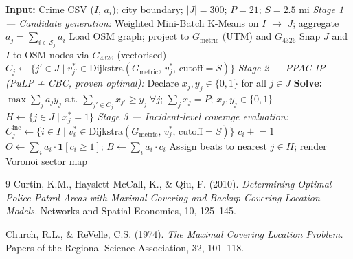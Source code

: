 \documentclass[12pt]{article}
\begin{document}
\begin{algorithm}[H]
\caption{IP PPAC Optimizer (PuLP + CBC)}
\begin{algorithmic}[1]
\State \textbf{Input:} Crime CSV ($I$, $a_i$); city boundary;
       $|J|=300$; $P=21$; $S=2.5$ mi
\State \textit{Stage 1 — Candidate generation:}
    Weighted Mini-Batch K-Means on $I$ $\to$ $J$;
    aggregate $a_j = \sum_{i \in \mathcal{S}_j} a_i$
\State Load OSM graph; project to $G_{\text{metric}}$ (UTM) and $G_{\text{4326}}$
\State Snap $J$ and $I$ to OSM nodes via $G_{\text{4326}}$ (vectorised)
    \State $C_j \leftarrow \{j' \in J \mid v^*_{j'} \in
           \text{Dijkstra}(G_{\text{metric}},\, v^*_j,\, \text{cutoff}=S)\}$
\EndFor
\State \textit{Stage 2 — PPAC IP (PuLP + CBC, proven optimal):}
\State Declare $x_j, y_j \in \{0,1\}$ for all $j \in J$
\State \textbf{Solve:} $\max \sum_{j} a_j y_j$ \; s.t.
    $\sum_{j' \in C_j} x_{j'} \ge y_j \;\forall j$;\;
    $\sum_j x_j = P$;\;
    $x_j, y_j \in \{0,1\}$
\State $H \leftarrow \{j \in J \mid x^*_j = 1\}$
\State \textit{Stage 3 — Incident-level coverage evaluation:}
    \State $C^{\text{inc}}_j \leftarrow \{i \in I \mid v^*_i \in
           \text{Dijkstra}(G_{\text{metric}},\, v^*_j,\, \text{cutoff}=S)\}$
        \State $c_i \mathrel{+}= 1$
    \EndFor
\EndFor
\State $O \leftarrow \sum_i a_i \cdot \mathbf{1}[c_i \ge 1]$;\quad
       $B \leftarrow \sum_i a_i \cdot c_i$
\State Assign beats to nearest $j \in H$; render Voronoi sector map
\end{algorithmic}
\end{algorithm}

\begin{thebibliography}{9}
Curtin, K.M., Hayslett-McCall, K., \& Qiu, F. (2010).
\textit{Determining Optimal Police Patrol Areas with Maximal Covering and
Backup Covering Location Models.}
Networks and Spatial Economics, 10, 125--145.

Church, R.L., \& ReVelle, C.S. (1974).
\textit{The Maximal Covering Location Problem.}
Papers of the Regional Science Association, 32, 101--118.
\end{thebibliography}
\end{document}
